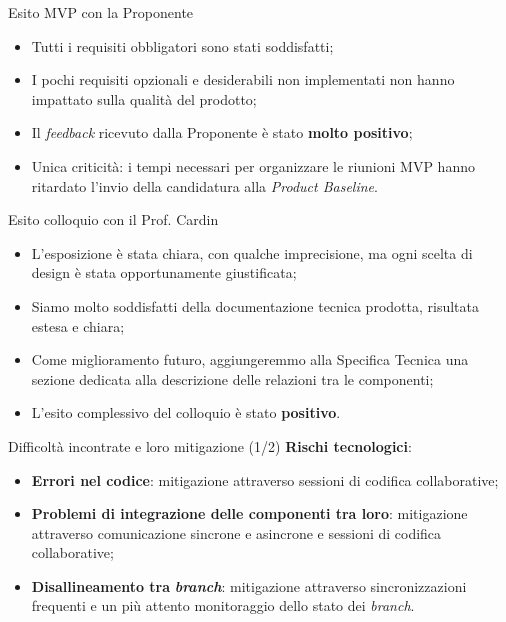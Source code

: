 \documentclass{beamer}
\begin{document}
\begin{frame}{Esito MVP con la Proponente}
  \begin{itemize}
    \item Tutti i requisiti obbligatori sono stati soddisfatti;
          \vspace{0.35cm}
    \item I pochi requisiti opzionali e desiderabili non implementati non hanno impattato sulla qualità del prodotto;
          \vspace{0.35cm}
    \item Il \textit{feedback} ricevuto dalla Proponente è stato \textbf{molto positivo};
          \vspace{0.35cm}
    \item Unica criticità: i tempi necessari per organizzare le riunioni MVP hanno ritardato l'invio della candidatura alla \textit{Product Baseline}.
  \end{itemize}
\end{frame}

\begin{frame}{Esito colloquio con il Prof. Cardin}
  \begin{itemize}
    \item L'esposizione è stata chiara, con qualche imprecisione, ma ogni scelta di design è stata opportunamente giustificata;
          \vspace{0.35cm}
    \item Siamo molto soddisfatti della documentazione tecnica prodotta, risultata estesa e chiara;
          \vspace{0.35cm}
    \item Come miglioramento futuro, aggiungeremmo alla Specifica Tecnica una sezione dedicata alla descrizione delle relazioni tra le componenti;
          \vspace{0.35cm}
    \item L'esito complessivo del colloquio è stato \textbf{positivo}.
  \end{itemize}
\end{frame}

\begin{frame}{Difficoltà incontrate e loro mitigazione (1/2)}
  \textbf{Rischi tecnologici}:
  \vspace{0.15cm}
  \begin{itemize}
    \item \textbf{Errori nel codice}: mitigazione attraverso sessioni di codifica collaborative;
          \vspace{0.35cm}
    \item \textbf{Problemi di integrazione delle componenti tra loro}: mitigazione attraverso comunicazione sincrone e asincrone e sessioni di codifica collaborative;
          \vspace{0.35cm}
    \item \textbf{Disallineamento tra} \textit{\textbf{branch}}: mitigazione attraverso sincronizzazioni frequenti e un più attento monitoraggio dello stato dei \textit{branch}.
          \vspace{0.35cm}
  \end{itemize}
\end{frame}
\end{document}

